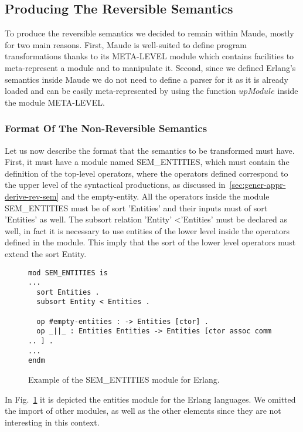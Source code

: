 \documentclass{article}[12pt,a4paper]
\theoremstyle{definition}
\begin{document}
\subsection{Producing The Reversible Semantics}

To produce the reversible semantics we decided to remain within Maude, mostly
for two main reasons. First, Maude is well-suited to define program transformations
thanks to its META-LEVEL module which contains facilities to meta-represent a
module and to manipulate it. Second, since we defined Erlang's semantics inside
Maude we do not need to define a parser for it as it is already loaded and can
be easily meta-represented by using the function $upModule$ inside the module
META-LEVEL.

\subsubsection{Format Of The Non-Reversible Semantics}
Let us now describe the format that the semantics to be transformed must have.
First, it must have a module named SEM_ENTITIES, which must contain the definition
of the top-level operators, where the operators defined correspond to the upper level
of the syntactical productions, as discussed
in~\ref{sec:gener-appr-derive-rev-sem} and the empty-entity.
All the operators inside the module SEM_ENTITIES must be of sort
'Entities' and their inputs must of sort 'Entities' as well. The subsort
relation 'Entity' \textless 'Entities' must be declared as well, in fact it is necessary
to use entities of the lower level inside the operators defined in the module.
This imply that the sort of the lower level operators must extend the sort
Entity.

\begin{figure}[t]
\begin{Verbatim}
mod SEM_ENTITIES is 
...
  sort Entities .
  subsort Entity < Entities .

  op #empty-entities : -> Entities [ctor] .
  op _||_ : Entities Entities -> Entities [ctor assoc comm .. ] .
...
endm
\end{Verbatim}
  \label{fig:sem-entities}
  \caption{Example of the SEM_ENTITIES module for Erlang.}
\end{figure}

In Fig.~\ref{fig:sem-entities} it is depicted the entities module for the Erlang
languages. We omitted the import of other modules, as well as the other elements
since they are not interesting in this context.
\end{document}
